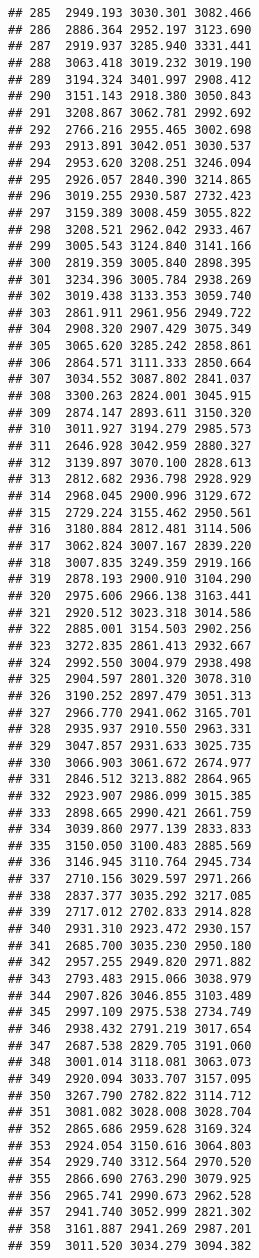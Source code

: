 \documentclass[
]{article}
\begin{document}
\begin{verbatim}
## 285  2949.193 3030.301 3082.466
## 286  2886.364 2952.197 3123.690
## 287  2919.937 3285.940 3331.441
## 288  3063.418 3019.232 3019.190
## 289  3194.324 3401.997 2908.412
## 290  3151.143 2918.380 3050.843
## 291  3208.867 3062.781 2992.692
## 292  2766.216 2955.465 3002.698
## 293  2913.891 3042.051 3030.537
## 294  2953.620 3208.251 3246.094
## 295  2926.057 2840.390 3214.865
## 296  3019.255 2930.587 2732.423
## 297  3159.389 3008.459 3055.822
## 298  3208.521 2962.042 2933.467
## 299  3005.543 3124.840 3141.166
## 300  2819.359 3005.840 2898.395
## 301  3234.396 3005.784 2938.269
## 302  3019.438 3133.353 3059.740
## 303  2861.911 2961.956 2949.722
## 304  2908.320 2907.429 3075.349
## 305  3065.620 3285.242 2858.861
## 306  2864.571 3111.333 2850.664
## 307  3034.552 3087.802 2841.037
## 308  3300.263 2824.001 3045.915
## 309  2874.147 2893.611 3150.320
## 310  3011.927 3194.279 2985.573
## 311  2646.928 3042.959 2880.327
## 312  3139.897 3070.100 2828.613
## 313  2812.682 2936.798 2928.929
## 314  2968.045 2900.996 3129.672
## 315  2729.224 3155.462 2950.561
## 316  3180.884 2812.481 3114.506
## 317  3062.824 3007.167 2839.220
## 318  3007.835 3249.359 2919.166
## 319  2878.193 2900.910 3104.290
## 320  2975.606 2966.138 3163.441
## 321  2920.512 3023.318 3014.586
## 322  2885.001 3154.503 2902.256
## 323  3272.835 2861.413 2932.667
## 324  2992.550 3004.979 2938.498
## 325  2904.597 2801.320 3078.310
## 326  3190.252 2897.479 3051.313
## 327  2966.770 2941.062 3165.701
## 328  2935.937 2910.550 2963.331
## 329  3047.857 2931.633 3025.735
## 330  3066.903 3061.672 2674.977
## 331  2846.512 3213.882 2864.965
## 332  2923.907 2986.099 3015.385
## 333  2898.665 2990.421 2661.759
## 334  3039.860 2977.139 2833.833
## 335  3150.050 3100.483 2885.569
## 336  3146.945 3110.764 2945.734
## 337  2710.156 3029.597 2971.266
## 338  2837.377 3035.292 3217.085
## 339  2717.012 2702.833 2914.828
## 340  2931.310 2923.472 2930.157
## 341  2685.700 3035.230 2950.180
## 342  2957.255 2949.820 2971.882
## 343  2793.483 2915.066 3038.979
## 344  2907.826 3046.855 3103.489
## 345  2997.109 2975.538 2734.749
## 346  2938.432 2791.219 3017.654
## 347  2687.538 2829.705 3191.060
## 348  3001.014 3118.081 3063.073
## 349  2920.094 3033.707 3157.095
## 350  3267.790 2782.822 3114.712
## 351  3081.082 3028.008 3028.704
## 352  2865.686 2959.628 3169.324
## 353  2924.054 3150.616 3064.803
## 354  2929.740 3312.564 2970.520
## 355  2866.690 2763.290 3079.925
## 356  2965.741 2990.673 2962.528
## 357  2941.740 3052.999 2821.302
## 358  3161.887 2941.269 2987.201
## 359  3011.520 3034.279 3094.382

\end{verbatim}
\end{document}
